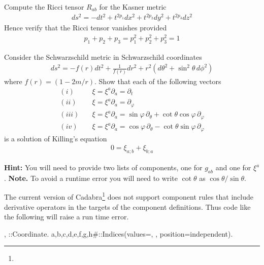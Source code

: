 \documentclass[a4paper,12pt]{article}
\numberwithin{equation}{section}%
\begin{document}
\begin{Exercises}
   \begin{Exercise}
      Compute the Ricci tensor $R_{ab}$ for the Kasner metric
      \begin{align*}
         ds^2 = -dt^2 + t^{2p_1} dx^2 + t^{2p_2} dy^2 + t^{2p_3} dz^2
      \end{align*}
      Hence verify that the Ricci tensor vanishes provided
      \begin{align*}
         p_1 + p_2 + p_3 = p^2_1 + p^2_2 +p^2_3 = 1
      \end{align*}
   \end{Exercise}

   \begin{Exercise}
      Consider the Schwarzschild metric in Schwarzschild coordinates
      \begin{align*}
         ds^2 = - f(r) dt^2
                + \frac{1}{f(r)} dr^2
                + r^2\left(d\theta^2 + \sin^2\theta\, d\phi^2\right)
      \end{align*}
      where $f(r) = (1-2m/r)$. Show that each of the following vectors
      \begin{align*}
         (i)   \quad & \xi = \xi^{a}\partial_{a} = \partial_{t}\\
         (ii)  \quad & \xi = \xi^{a}\partial_{a} = \partial_{\varphi}\\
         (iii) \quad & \xi = \xi^{a}\partial_{a}
                           = \sin\varphi\, \partial_{\theta}
                             + \cot\theta \cos\varphi\, \partial_{\varphi}\\
         (iv)  \quad & \xi = \xi^{a}\partial_{a}
                           = \cos\varphi\, \partial_{\theta}
                             - \cot\theta \sin\varphi\, \partial_{\varphi}
      \end{align*}
      is a solution of Killing's equation
      \begin{align*}
         0 = \xi_{a;b} + \xi_{b;a}
      \end{align*}

      {\bf Hint:} You will need to provide two lists of components,
                  one for $g_{ab}$ and one for $\xi^{a}$.
      {\bf Note.} To avoid a runtime error you will need to write
                  $\cot\theta$ as $\cos\theta/\sin\theta$.
   \end{Exercise}

   \begin{Exercise}
      The current version of Cadabra\footnote{\CdbVersion} does not support component rules
      that include derivative operators in the targets of the component definitions. Thus
      code like the following will raise a run time error.
      \begin{cadabra}
         {\theta, \varphi}::Coordinate.
         {a,b,c,d,e,f,g,h#}::Indices(values={\theta, \varphi}, position=independent).


\end{cadabra}
\end{Exercise}
\end{Exercises}
\end{document}
